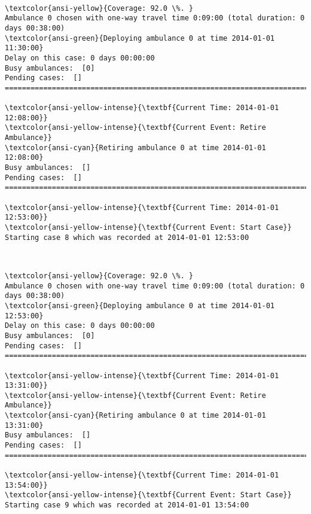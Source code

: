 \documentclass[11pt]{article}
\begin{document}
    \begin{center}
    \end{center}
    { \hspace*{\fill} \\}
    
    \begin{Verbatim}[commandchars=\\\{\}]
\textcolor{ansi-yellow}{Coverage: 92.0 \%. }
Ambulance 0 chosen with one-way travel time 0:09:00 (total duration: 0 days 00:38:00)
\textcolor{ansi-green}{Deploying ambulance 0 at time 2014-01-01 11:30:00}
Delay on this case: 0 days 00:00:00
Busy ambulances:  [0]
Pending cases:  []
========================================================================

\textcolor{ansi-yellow-intense}{\textbf{Current Time: 2014-01-01 12:08:00}}
\textcolor{ansi-yellow-intense}{\textbf{Current Event: Retire Ambulance}}
\textcolor{ansi-cyan}{Retiring ambulance 0 at time 2014-01-01 12:08:00}
Busy ambulances:  []
Pending cases:  []
========================================================================

\textcolor{ansi-yellow-intense}{\textbf{Current Time: 2014-01-01 12:53:00}}
\textcolor{ansi-yellow-intense}{\textbf{Current Event: Start Case}}
Starting case 8 which was recorded at 2014-01-01 12:53:00

    \end{Verbatim}

    \begin{center}
    \end{center}
    { \hspace*{\fill} \\}
    
    \begin{Verbatim}[commandchars=\\\{\}]
\textcolor{ansi-yellow}{Coverage: 92.0 \%. }
Ambulance 0 chosen with one-way travel time 0:09:00 (total duration: 0 days 00:38:00)
\textcolor{ansi-green}{Deploying ambulance 0 at time 2014-01-01 12:53:00}
Delay on this case: 0 days 00:00:00
Busy ambulances:  [0]
Pending cases:  []
========================================================================

\textcolor{ansi-yellow-intense}{\textbf{Current Time: 2014-01-01 13:31:00}}
\textcolor{ansi-yellow-intense}{\textbf{Current Event: Retire Ambulance}}
\textcolor{ansi-cyan}{Retiring ambulance 0 at time 2014-01-01 13:31:00}
Busy ambulances:  []
Pending cases:  []
========================================================================

\textcolor{ansi-yellow-intense}{\textbf{Current Time: 2014-01-01 13:54:00}}
\textcolor{ansi-yellow-intense}{\textbf{Current Event: Start Case}}
Starting case 9 which was recorded at 2014-01-01 13:54:00

    \end{Verbatim}
\end{document}
